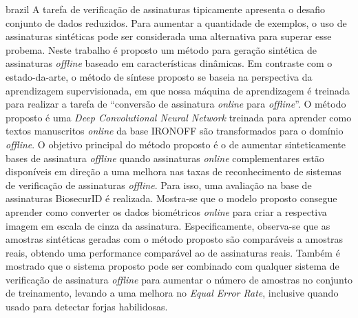 \begin{resumo}[Resumo]
 \begin{otherlanguage*}{brazil}
	 A tarefa de verificação de assinaturas tipicamente apresenta o desafio conjunto de dados reduzidos. Para aumentar a quantidade de exemplos, o uso de assinaturas sintéticas pode ser considerada uma alternativa para superar esse probema. Neste trabalho é proposto um método para geração sintética de assinaturas \textit{offline} baseado em características dinâmicas. Em contraste com o estado-da-arte, o método de síntese proposto se baseia na perspectiva da aprendizagem supervisionada, em que nossa máquina de aprendizagem é treinada para realizar a tarefa de ``conversão de assinatura \textit{online} para \textit{offline}''. O método proposto é uma \textit{Deep Convolutional Neural Network} treinada para aprender como textos manuscritos \textit{online} da base IRONOFF são transformados para o domínio \textit{offline}. O objetivo principal do método proposto é o de aumentar sinteticamente bases de assinatura \textit{offline} quando assinaturas \textit{online} complementares estão disponíveis em direção a uma melhora nas taxas de reconhecimento de sistemas de verificação de assinaturas \textit{offline}. Para isso, uma avaliação na base de assinaturas BiosecurID é realizada. Mostra-se que o modelo proposto consegue aprender como converter os dados biométricos \textit{online} para criar a respectiva imagem em escala de cinza da assinatura. Especificamente, observa-se que as amostras sintéticas geradas com o método proposto são comparáveis a amostras reais, obtendo uma performance comparável ao de assinaturas reais. Também é mostrado que o sistema proposto pode ser combinado com qualquer sistema de verificação de assinatura \textit{offline} para aumentar o número de amostras no conjunto de treinamento, levando a uma melhora no \textit{Equal Error Rate}, inclusive quando usado para detectar forjas habilidosas.
  
   \vspace{\onelineskip}
 
   \noindent 
 \end{otherlanguage*}
\end{resumo}


